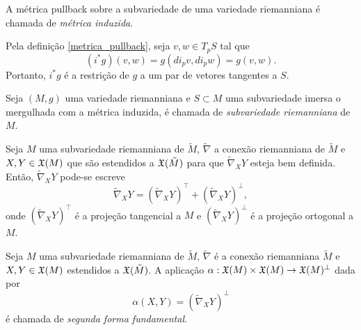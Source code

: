 \begin{definicao}\label{metrica_induzida}
	A métrica pullback sobre a subvariedade de uma variedade riemanniana é chamada de \emph{métrica induzida}.
\end{definicao}

\begin{observacao}
	Pela definição \ref{metrica_pullback}, seja $v,w \in T_p S$ tal que
	\begin{equation*}
	(i^* g)(v,w) = g(di_p v, di_p w) = g(v,w). 
	\end{equation*}
	Portanto, $i^* g$ é a restrição de $g$ a um par de vetores tangentes a $S$. 
\end{observacao}



\begin{definicao}
	Seja $(M,g)$ uma variedade riemanniana e $S \subset M$ uma subvariedade imersa o mergulhada com a métrica induzida, é chamada de \emph{subvariedade riemanniana} de $M$.
\end{definicao}

\begin{observacao}
	Seja $M$ uma subvariedade riemanniana de $\tilde{M}$,
	$\tilde{\nabla}$ a conexão riemanniana de $\tilde{M}$ e 
	$X,Y \in \mathfrak{X}(M)$ que são estendidos a $\mathfrak{X}(\tilde{M})$ para que $\tilde{\nabla}_X Y$ esteja bem definida.
	Então, $\tilde{\nabla}_X Y$ pode-se escreve
	\begin{equation*}
	\tilde{\nabla}_X Y = \left(\tilde{\nabla}_X Y\right)^\top + \left(\tilde{\nabla}_X Y\right)^\perp,
	\end{equation*}
	onde $\left(\tilde{\nabla}_X Y\right)^\top$ é a projeção tangencial a $M$ e $\left(\tilde{\nabla}_X Y\right)^\perp$ é a projeção ortogonal a $M$.
\end{observacao}

\begin{definicao}
	Seja $M$ uma subvariedade riemanniana de $\tilde{M}$,
	$\tilde{\nabla}$ é a conexão riemanniana $\tilde{M}$ e
	$X,Y \in \mathfrak{X}(M)$ estendidos a $\mathfrak{X}(\tilde{M})$.
	A aplicação $\alpha: \mathfrak{X}(M) \times \mathfrak{X}(M) \rightarrow \mathfrak{X}(M)^\perp$ dada por
	\begin{equation*}
		\alpha(X,Y) = (\tilde{\nabla}_X Y)^\perp
	\end{equation*} 
	é chamada de \emph{segunda forma fundamental}.
\end{definicao}

